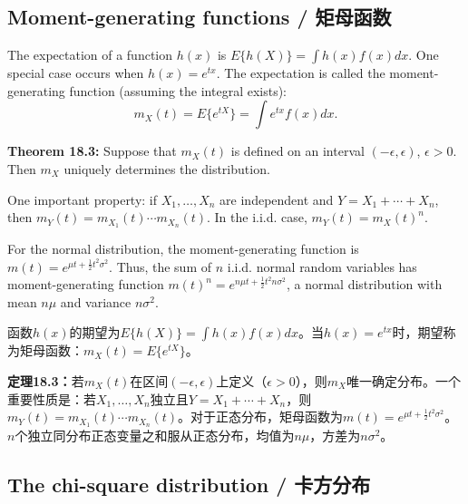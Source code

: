 \subsection{Moment-generating functions / 矩母函数}

\begin{original}
The expectation of a function $h(x)$ is $E\{h(X)\} = \int h(x) f(x)dx$. One special case occurs when $h(x) = e^{tx}$. The expectation is called the moment-generating function (assuming the integral exists):
\[
m_X(t) = E\{e^{tX}\} = \int e^{tx} f(x)dx.
\]

\textbf{Theorem 18.3:} Suppose that $m_X(t)$ is defined on an interval $(-\epsilon, \epsilon)$, $\epsilon > 0$. Then $m_X$ uniquely determines the distribution.

One important property: if $X_1, \ldots, X_n$ are independent and $Y = X_1 + \cdots + X_n$, then $m_Y(t) = m_{X_1}(t) \cdots m_{X_n}(t)$. In the i.i.d. case, $m_Y(t) = m_X(t)^n$.

For the normal distribution, the moment-generating function is $m(t) = e^{\mu t + \frac{1}{2}t^2\sigma^2}$. Thus, the sum of $n$ i.i.d. normal random variables has moment-generating function $m(t)^n = e^{n\mu t + \frac{1}{2}t^2 n\sigma^2}$, a normal distribution with mean $n\mu$ and variance $n\sigma^2$.
\end{original}
\begin{translation}
函数$h(x)$的期望为$E\{h(X)\} = \int h(x) f(x)dx$。当$h(x) = e^{tx}$时，期望称为矩母函数：$m_X(t) = E\{e^{tX}\}$。

\textbf{定理18.3：}若$m_X(t)$在区间$(-\epsilon, \epsilon)$上定义（$\epsilon > 0$），则$m_X$唯一确定分布。一个重要性质是：若$X_1, \ldots, X_n$独立且$Y = X_1 + \cdots + X_n$，则$m_Y(t) = m_{X_1}(t) \cdots m_{X_n}(t)$。对于正态分布，矩母函数为$m(t) = e^{\mu t + \frac{1}{2}t^2\sigma^2}$。$n$个独立同分布正态变量之和服从正态分布，均值为$n\mu$，方差为$n\sigma^2$。
\end{translation}

\subsection{The chi-square distribution / 卡方分布}

